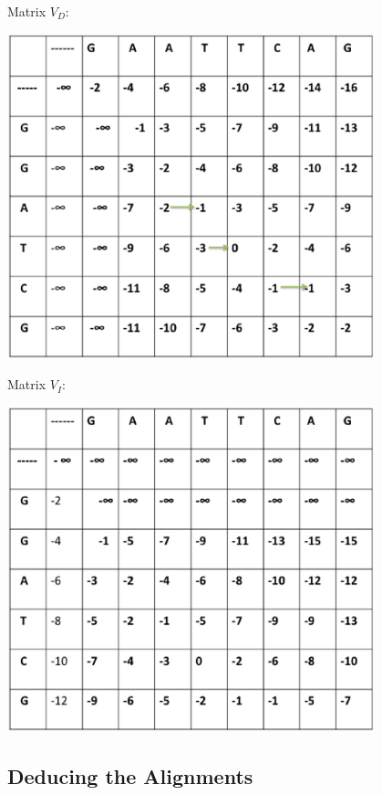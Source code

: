 \documentclass[english, a4paper,11pt]{article}
\begin{document}
\newpage
Matrix $V_D$:
\begin{center}
\includegraphics[width=0.8\textwidth]{Slide2.eps}
\end{center}

Matrix $V_I$:
\begin{center}

\includegraphics[width=0.8\textwidth]{Slide3.eps}
\end{center}

\subsection{Deducing the Alignments}
\end{document}
